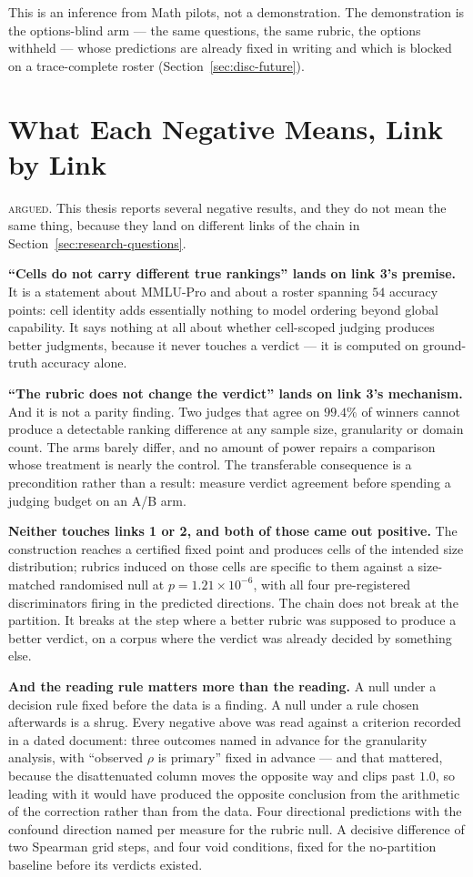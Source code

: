 This is an inference from Math pilots, not a demonstration. The
demonstration is the options-blind arm --- the same questions, the same
rubric, the options withheld --- whose predictions are already fixed in
writing and which is blocked on a trace-complete roster
(Section~\ref{sec:disc-future}).

\section{What Each Negative Means, Link by Link}\label{sec:disc-rq2}

\textsc{argued}. This thesis reports several negative results, and they
do not mean the same thing, because they land on different links of the
chain in Section~\ref{sec:research-questions}.

\textbf{``Cells do not carry different true rankings'' lands on link 3's
premise.} It is a statement about MMLU-Pro and about a roster spanning
$54$ accuracy points: cell identity adds essentially nothing to model
ordering beyond global capability. It says nothing at all about whether
cell-scoped judging produces better judgments, because it never touches
a verdict --- it is computed on ground-truth accuracy alone.

\textbf{``The rubric does not change the verdict'' lands on link 3's
mechanism.} And it is not a parity finding. Two judges that agree on
$99.4\%$ of winners cannot produce a detectable ranking difference at
any sample size, granularity or domain count. The arms barely differ,
and no amount of power repairs a comparison whose treatment is nearly
the control. The transferable consequence is a precondition rather than
a result: measure verdict agreement before spending a judging budget on
an A/B arm.

\textbf{Neither touches links 1 or 2, and both of those came out
positive.} The construction reaches a certified fixed point and
produces cells of the intended size distribution; rubrics induced on
those cells are specific to them against a size-matched randomised null
at $p = 1.21 \times 10^{-6}$, with all four pre-registered
discriminators firing in the predicted directions. The chain does not
break at the partition. It breaks at the step where a better rubric was
supposed to produce a better verdict, on a corpus where the verdict was
already decided by something else.

\textbf{And the reading rule matters more than the reading.} A null
under a decision rule fixed before the data is a finding. A null under a
rule chosen afterwards is a shrug. Every negative above was read
against a criterion recorded in a dated document: three outcomes named
in advance for the granularity analysis, with ``observed $\rho$ is
primary'' fixed in advance --- and that mattered, because the
disattenuated column moves the opposite way and clips past $1.0$, so
leading with it would have produced the opposite conclusion from the
arithmetic of the correction rather than from the data. Four
directional predictions with the confound direction named per measure
for the rubric null. A decisive difference of two Spearman grid steps,
and four void conditions, fixed for the no-partition baseline before its
verdicts existed.

